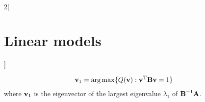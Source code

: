 \documentclass[../../../main_math.tex]{subfiles}
\begin{document}
\begin{multicols}{2}[\section{Linear models}]
\begin{theorem}
\begin{align*}
      \boldsymbol{\mathrm{v}}_1  & =\operatorname*{arg\,max}\{Q(\boldsymbol{\mathrm{v}}):{\boldsymbol{\mathrm{v}}}^{\mathrm{T}}\boldsymbol{\mathrm{Bv}}=1\}
    \end{align*}
    where $\boldsymbol{\mathrm{v}}_1$ is the eigenvector of the largest eigenvalue $\lambda_1$ of $\boldsymbol{\mathrm{B}}^{-1}\boldsymbol{\mathrm{A}}$.
  \end{theorem}

\end{multicols}
\end{document}
